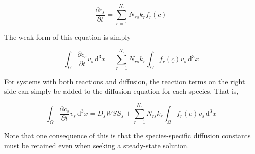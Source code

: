 \begin{equation}
  \frac{\partial c_s}{\partial t} = 
  \sum_{r=1}^{N_r} N_{rs} k_r f_r\left(\underline{c}\right)
\end{equation}

The weak form of this equation is simply

\begin{equation}
  \int_\Omega \frac{\partial c_s}{\partial t} v_s \,\mathrm{d}^3x = 
  \sum_{r=1}^{N_r} N_{rs} k_r \int_\Omega f_r\left(\underline{c}\right) v_s \,\mathrm{d}^3x
\end{equation}

For systems with both reactions and diffusion,
the reaction terms on the right side can simply be added to the diffusion
equation for each species. That is,

\begin{equation}
  \boxed{
    \int_\Omega \frac{\partial c_s}{\partial t} v_s \,\mathrm{d}^3x = 
    D_s WSS_s +
    \sum_{r=1}^{N_r} N_{rs} k_r \int_\Omega f_r\left(\underline{c}\right) v_s \,\mathrm{d}^3x
  }
\end{equation}

Note that one consequence of this is that the species-specific diffusion constants
must be retained even when seeking a steady-state solution.